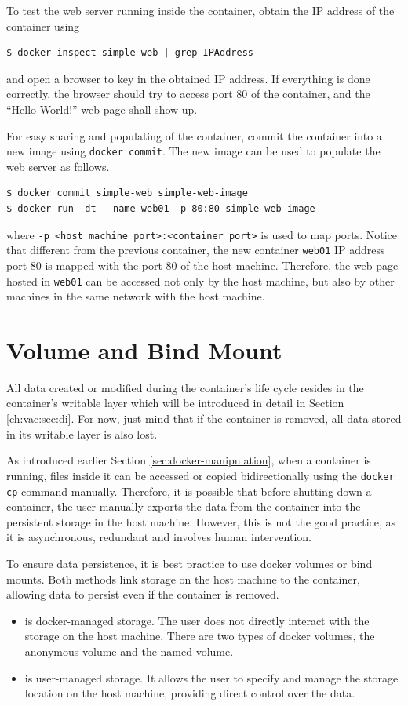 To test the web server running inside the container, obtain the IP address of the container using
\begin{lstlisting}
$ docker inspect simple-web | grep IPAddress
\end{lstlisting}
and open a browser to key in the obtained IP address. If everything is done correctly, the browser should try to access port 80 of the container, and the ``Hello World!'' web page shall show up.

For easy sharing and populating of the container, commit the container into a new image using \verb|docker commit|. The new image can be used to populate the web server as follows.
\begin{lstlisting}
$ docker commit simple-web simple-web-image
$ docker run -dt --name web01 -p 80:80 simple-web-image
\end{lstlisting}
where \verb|-p <host machine port>:<container port>| is used to map ports. Notice that different from the previous container, the new container \verb|web01| IP address port 80 is mapped with the port 80 of the host machine. Therefore, the web page hosted in \verb|web01| can be accessed not only by the host machine, but also by other machines in the same network with the host machine.

\section{Volume and Bind Mount} \label{ch:vac:subsec:dockervolume}

All data created or modified during the container's life cycle resides in the container's writable layer which will be introduced in detail in Section \ref{ch:vac:sec:di}. For now, just mind that if the container is removed, all data stored in its writable layer is also lost.

As introduced earlier Section \ref{sec:docker-manipulation}, when a container is running, files inside it can be accessed or copied bidirectionally using the \verb|docker cp| command manually. Therefore, it is possible that before shutting down a container, the user manually exports the data from the container into the persistent storage in the host machine. However, this is not the good practice, as it is asynchronous, redundant and involves human intervention.

To ensure data persistence, it is best practice to use docker volumes or bind mounts. Both methods link storage on the host machine to the container, allowing data to persist even if the container is removed.
\begin{itemize}
  \item {} is docker-managed storage. The user does not directly interact with the storage on the host machine. There are two types of docker volumes, the anonymous volume and the named volume.
  \item {} is user-managed storage. It allows the user to specify and manage the storage location on the host machine, providing direct control over the data.
\end{itemize}

